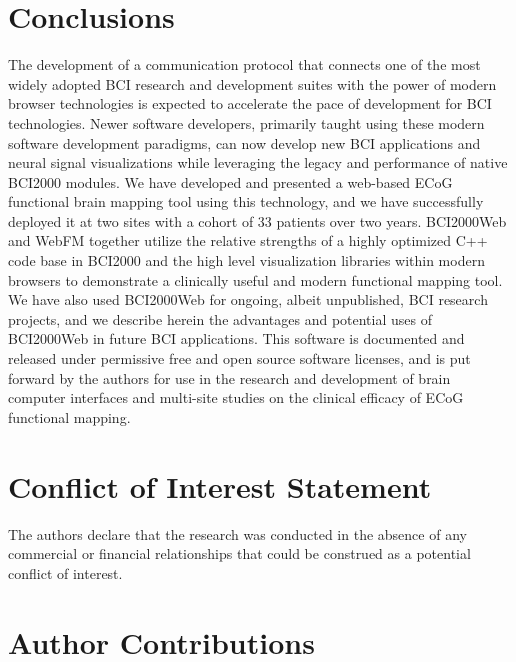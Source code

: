 \documentclass[utf8]{frontiersSCNS}
\begin{document}
\section{Conclusions}

The development of a communication protocol that connects one of the most widely adopted BCI research and development suites with the power of modern browser technologies is expected to accelerate the pace of development for BCI technologies.  Newer software developers, primarily taught using these modern software development paradigms, can now develop new BCI applications and neural signal visualizations while leveraging the legacy and performance of native BCI2000 modules. We have developed and presented a web-based ECoG functional brain mapping tool using this technology, and we have successfully deployed it at two sites with a cohort of 33 patients over two years.  BCI2000Web and WebFM together utilize the relative strengths of a highly optimized C++ code base in BCI2000 and the high level visualization libraries within modern browsers to demonstrate a clinically useful and modern functional mapping tool. We have also used BCI2000Web for ongoing, albeit unpublished, BCI research projects, and we describe herein the advantages and potential uses of BCI2000Web in future BCI applications. This software is documented and released under permissive free and open source software licenses, and is put forward by the authors for use in the research and development of brain computer interfaces and multi-site studies on the clinical efficacy of ECoG functional mapping.



\section*{Conflict of Interest Statement}

The authors declare that the research was conducted in the absence of any commercial or financial relationships that could be construed as a potential conflict of interest.


\section*{Author Contributions}
\end{document}
